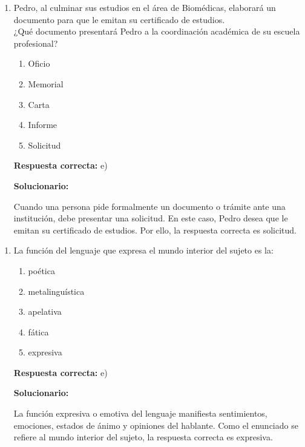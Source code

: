 \begin{enumerate}[resume]
	
	\item Pedro, al culminar sus estudios en el área de Biomédicas, elaborará un documento para que le emitan su certificado de estudios.\\
	¿Qué documento presentará Pedro a la coordinación académica de su escuela profesional?
	
	\begin{enumerate}[label=\alph*)]
		\item Oficio
		\item Memorial
		\item Carta
		\item Informe
		\item Solicitud
	\end{enumerate}
	
	\textbf{Respuesta correcta:} e)
	
	\vspace{2mm}
	\textbf{Solucionario:}
	
	Cuando una persona pide formalmente un documento o trámite ante una institución, debe presentar una solicitud. En este caso, Pedro desea que le emitan su certificado de estudios. Por ello, la respuesta correcta es solicitud.
	
\end{enumerate}


\begin{enumerate}[resume]
	
	\item La función del lenguaje que expresa el mundo interior del sujeto es la:
	
	\begin{enumerate}[label=\alph*)]
		\item poética
		\item metalinguística
		\item apelativa
		\item fática
		\item expresiva
	\end{enumerate}
	
	\textbf{Respuesta correcta:} e)
	
	\vspace{2mm}
	\textbf{Solucionario:}
	
	La función expresiva o emotiva del lenguaje manifiesta sentimientos, emociones, estados de ánimo y opiniones del hablante. Como el enunciado se refiere al mundo interior del sujeto, la respuesta correcta es expresiva.
	
\end{enumerate}


